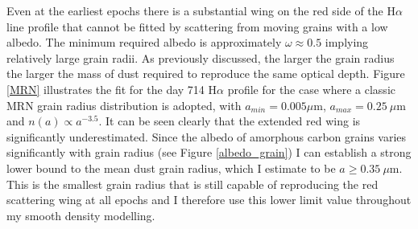 Even at the earliest epochs there is a substantial wing on the red side of 
the H$\alpha$ line profile that cannot be fitted by scattering from moving 
grains with a low albedo.  The minimum required albedo is approximately 
$\omega \approx 0.5$ implying relatively large grain radii.  As previously 
discussed, the larger the grain radius the larger the mass of dust required 
to reproduce the same optical depth.  Figure \ref{MRN} illustrates the fit 
for the day 714 H$\alpha$ profile for the case where a classic MRN 
\citep{Mathis1977} grain radius distribution is adopted, with $a_{min}=0.005 
\mu$m, $a_{max}=0.25~\mu$m and $n(a) \propto a^{-3.5}$.  It can be seen 
clearly that the extended red wing is significantly underestimated.  
Since the albedo of amorphous carbon grains varies significantly with 
grain radius (see Figure \ref{albedo_grain}) I can establish a strong 
lower bound to the mean dust grain radius, which I estimate to be $a \ge 
0.35~\mu$m.  This is the smallest grain radius that is still capable of 
reproducing the red scattering wing at all epochs and I therefore use 
this lower limit value throughout my smooth density modelling.


